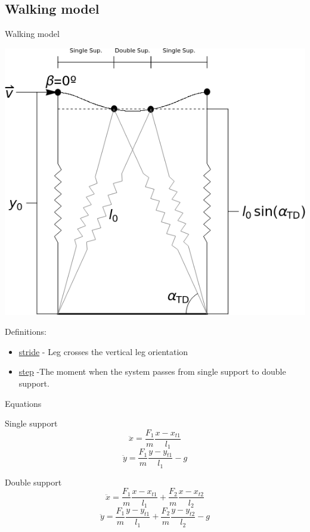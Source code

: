 \documentclass{beamer}
\begin{document}
\subsection{Walking model}
\begin{frame}{Walking model}
  \begin{center}
  \includegraphics[height=0.5\textheight]{Seyfarth2006_trimmed.png}
  \end{center}
Definitions:
  \begin{itemize}
\item  \underline{stride} - Leg crosses the vertical leg orientation
\item  \underline{step} -The moment when the system passes from single support to double support.
  \end{itemize}
\end{frame}

\begin{frame}{Equations}

  \begin{block}{Single support}
  \begin{equation}
  \ddot{x}=\frac{F_1}{m}\frac{x-x_{t1}}{l_1}
  \label{eq.singlesuppx}
  \end{equation}
\begin{equation}
  \ddot{y}=\frac{F_1}{m}\frac{y-y_{t1}}{l_1}-g
  \label{eq.singlesuppy}
\end{equation}
\end{block}

  \begin{block}{Double support}
\begin{equation}
 \ddot{x}=\frac{F_1}{m}\frac{x-x_{t1}}{l_1}+\frac{F_2}{m}\frac{x-x_{t2}}{l_2}
 \label{eq.doublesuppx}
  \end{equation}
\begin{equation}
  \ddot{y}=\frac{F_1}{m}\frac{y-y_{t1}}{l_1}+\frac{F_2}{m}\frac{y-y_{t2}}{l_2}-g
  \label{eq.doublesuppy}
\end{equation}
\end{block}

\end{frame}
\end{document}
